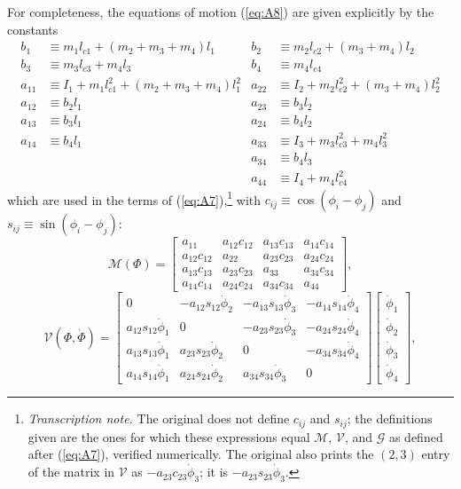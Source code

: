 \documentclass[11pt]{article}
\newcommand{\tnote}[1]{\footnote{\textit{Transcription note.} #1}}
\begin{document}
For completeness, the equations of motion (\ref{eq:A8}) are given explicitly
by the constants
\begin{align*}
b_1 &\equiv m_1l_{c1} + (m_2+m_3+m_4)l_1 &
b_2 &\equiv m_2l_{c2} + (m_3+m_4)l_2\\
b_3 &\equiv m_3l_{c3} + m_4l_3 &
b_4 &\equiv m_4l_{c4}\\[4pt]
a_{11} &\equiv I_1 + m_1l_{c1}^2 + (m_2+m_3+m_4)l_1^2 &
a_{22} &\equiv I_2 + m_2l_{c2}^2 + (m_3+m_4)l_2^2\\
a_{12} &\equiv b_2l_1 & a_{23} &\equiv b_3l_2\\
a_{13} &\equiv b_3l_1 & a_{24} &\equiv b_4l_2\\
a_{14} &\equiv b_4l_1 & a_{33} &\equiv I_3 + m_3l_{c3}^2 + m_4l_3^2\\
& & a_{34} &\equiv b_4l_3\\
& & a_{44} &\equiv I_4 + m_4l_{c4}^2
\end{align*}
which are used in the terms of (\ref{eq:A7}),\tnote{The original does not
define $c_{ij}$ and $s_{ij}$; the definitions given are the ones for which
these expressions equal $\mathcal{M}$, $\mathcal{V}$, and $\mathcal{G}$ as
defined after (\ref{eq:A7}), verified numerically. The original also prints
the $(2,3)$ entry of the matrix in $\mathcal{V}$ as $-a_{23}c_{23}\dot{\phi}_3$;
it is $-a_{23}s_{23}\dot{\phi}_3$.} with
$c_{ij}\equiv\cos(\phi_i-\phi_j)$ and $s_{ij}\equiv\sin(\phi_i-\phi_j)$:
\[
\mathcal{M}(\Phi) = \begin{bmatrix}
a_{11} & a_{12}c_{12} & a_{13}c_{13} & a_{14}c_{14}\\
a_{12}c_{12} & a_{22} & a_{23}c_{23} & a_{24}c_{24}\\
a_{13}c_{13} & a_{23}c_{23} & a_{33} & a_{34}c_{34}\\
a_{14}c_{14} & a_{24}c_{24} & a_{34}c_{34} & a_{44}
\end{bmatrix},
\]
\[
\mathcal{V}(\Phi,\dot{\Phi}) = \begin{bmatrix}
0 & -a_{12}s_{12}\dot{\phi}_2 & -a_{13}s_{13}\dot{\phi}_3
& -a_{14}s_{14}\dot{\phi}_4\\
a_{12}s_{12}\dot{\phi}_1 & 0 & -a_{23}s_{23}\dot{\phi}_3
& -a_{24}s_{24}\dot{\phi}_4\\
a_{13}s_{13}\dot{\phi}_1 & a_{23}s_{23}\dot{\phi}_2 & 0
& -a_{34}s_{34}\dot{\phi}_4\\
a_{14}s_{14}\dot{\phi}_1 & a_{24}s_{24}\dot{\phi}_2
& a_{34}s_{34}\dot{\phi}_3 & 0
\end{bmatrix}
\begin{bmatrix}\dot{\phi}_1\\ \dot{\phi}_2\\ \dot{\phi}_3\\ \dot{\phi}_4
\end{bmatrix},
\]
\end{document}
